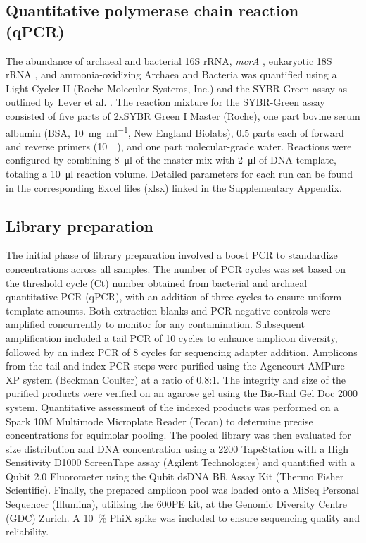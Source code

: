 \subsection{Quantitative polymerase chain reaction (qPCR)}
The abundance of archaeal \citep{cadillo2006vertical, yu2018growth} and bacterial \citep{lever2015modular, ohkuma1998phylogenetic} 16S rRNA, \textit{mcrA} \citep{steinberg2009mcra}, eukaryotic 18S rRNA \citep{torti2015extraction, hardy2010carbon}, and ammonia-oxidizing Archaea \citep{francis2005ubiquity} and Bacteria \citep{rotthauwe1997ammonia} was quantified using a Light Cycler II (Roche Molecular Systems, Inc.) and the SYBR-Green assay as outlined by Lever et al. \citep{lever2015modular}.
The reaction mixture for the SYBR-Green assay consisted of five parts of 2xSYBR Green I Master (Roche), one part bovine serum albumin (BSA, \SI{10}{\milli\gram\per\milli\litre}, New England Biolabs), 0.5 parts each of forward and reverse primers (\SI{10}{\micro\molar}), and one part molecular-grade water.
Reactions were configured by combining \SI{8}{\micro\litre} of the master mix with \SI{2}{\micro\litre} of DNA template, totaling a \SI{10}{\micro\litre} reaction volume.
Detailed parameters for each run can be found in the corresponding Excel files (xlsx) linked in the Supplementary Appendix.

\subsection{Library preparation}
The initial phase of library preparation involved a boost PCR to standardize concentrations across all samples.
The number of PCR cycles was set based on the threshold cycle (Ct) number obtained from bacterial and archaeal quantitative PCR (qPCR), with an addition of three cycles to ensure uniform template amounts.
Both extraction blanks and PCR negative controls were amplified concurrently to monitor for any contamination.
Subsequent amplification included a tail PCR of 10 cycles to enhance amplicon diversity, followed by an index PCR of 8 cycles for sequencing adapter addition.
Amplicons from the tail and index PCR steps were purified using the Agencourt AMPure XP system (Beckman Coulter) at a ratio of 0.8:1.
The integrity and size of the purified products were verified on an agarose gel using the Bio-Rad Gel Doc 2000 system.
Quantitative assessment of the indexed products was performed on a Spark 10M Multimode Microplate Reader (Tecan) to determine precise concentrations for equimolar pooling.
The pooled library was then evaluated for size distribution and DNA concentration using a 2200 TapeStation with a High Sensitivity D1000 ScreenTape assay (Agilent Technologies) and quantified with a Qubit 2.0 Fluorometer using the Qubit dsDNA BR Assay Kit (Thermo Fisher Scientific).
Finally, the prepared amplicon pool was loaded onto a MiSeq Personal Sequencer (Illumina), utilizing the 600PE kit, at the Genomic Diversity Centre (GDC) Zurich.
A \SI{10}{\percent} PhiX spike was included to ensure sequencing quality and reliability.

